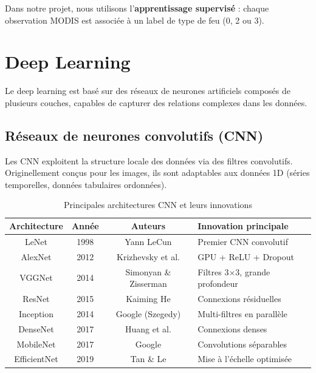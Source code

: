 \documentclass[12pt,a4paper]{report}
\begin{document}
Dans notre projet, nous utilisons l'\textbf{apprentissage supervis\'{e}} : chaque observation MODIS est associ\'{e}e \`{a} un label de type de feu (0, 2 ou 3).

\section{Deep Learning}

Le deep learning est bas\'{e} sur des r\'{e}seaux de neurones artificiels compos\'{e}s de plusieurs couches, capables de capturer des relations complexes dans les donn\'{e}es.

\subsection{R\'{e}seaux de neurones convolutifs (CNN)}

Les CNN exploitent la structure locale des donn\'{e}es via des filtres convolutifs. Originellement con\c{c}us pour les images, ils sont adaptables aux donn\'{e}es 1D (s\'{e}ries temporelles, donn\'{e}es tabulaires ordonn\'{e}es).

\begin{table}[H]
\centering
\begin{tabular}{|c|c|c|p{5cm}|}
\hline
\rowcolor{bleu!15}
\textbf{Architecture} & \textbf{Ann\'{e}e} & \textbf{Auteurs} & \textbf{Innovation principale} \\
\hline
LeNet & 1998 & Yann LeCun & Premier CNN convolutif \\
\hline
AlexNet & 2012 & Krizhevsky et al. & GPU + ReLU + Dropout \\
\hline
VGGNet & 2014 & Simonyan \& Zisserman & Filtres 3$\times$3, grande profondeur \\
\hline
ResNet & 2015 & Kaiming He & Connexions r\'{e}siduelles \\
\hline
Inception & 2014 & Google (Szegedy) & Multi-filtres en parall\`{e}le \\
\hline
DenseNet & 2017 & Huang et al. & Connexions denses \\
\hline
MobileNet & 2017 & Google & Convolutions s\'{e}parables \\
\hline
EfficientNet & 2019 & Tan \& Le & Mise \`{a} l'\'{e}chelle optimis\'{e}e \\
\hline
\end{tabular}
\caption{Principales architectures CNN et leurs innovations}
\label{tab:cnn_archi}
\end{table}
\end{document}
